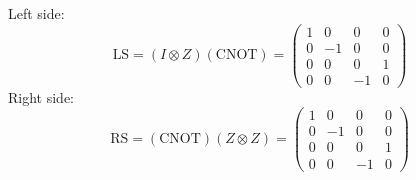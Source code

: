 \documentclass[10pt]{article}
\begin{document}
\begin{enumerate}[label=\alph*)]
			\begin{solution}
				Left side: 
				\[
					\text{LS} = (I \otimes Z)(\text{CNOT}) = \begin{pmatrix} 1&0&0&0\\0&-1&0&0\\0&0&0&1\\
					0&0&-1&0\end{pmatrix} 
				\] 
				Right side: 
				\[
				\text{RS} = (\text{CNOT})(Z \otimes Z) = \begin{pmatrix} 1&0&0&0\\0&-1&0&0\\0&0&0&1\\
					0&0&-1&0\end{pmatrix} 
				\] 
			\end{solution}
	 \end{enumerate}
\end{document}
